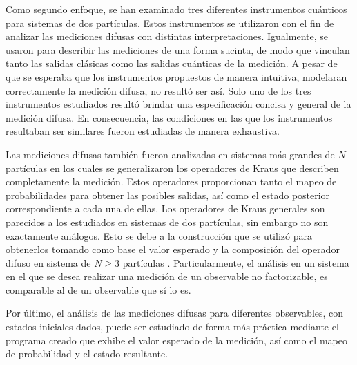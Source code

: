 
Como segundo enfoque, se han examinado tres diferentes instrumentos cuánticos
para sistemas de dos partículas. Estos instrumentos se utilizaron con el fin de
analizar las mediciones difusas con distintas interpretaciones.  Igualmente, se
usaron para describir las mediciones de una forma sucinta, de modo que vinculan
tanto las salidas clásicas como las salidas cuánticas de la medición. A pesar
de que se esperaba que los instrumentos propuestos de manera intuitiva,
modelaran correctamente la medición difusa, no resultó ser así. Solo uno de los
tres instrumentos estudiados resultó brindar una especificación concisa y
general de la medición difusa. En consecuencia, las condiciones en las que los
instrumentos resultaban ser similares fueron estudiadas de manera exhaustiva. 




Las mediciones difusas también fueron analizadas en sistemas más grandes de $N$
partículas en los cuales se generalizaron los operadores de Kraus que describen
completamente la medición. Estos operadores proporcionan tanto el mapeo de
probabilidades para obtener las posibles salidas, así como el estado posterior
correspondiente a cada una de ellas. Los operadores de Kraus generales son
parecidos a los estudiados en sistemas de dos partículas, sin embargo no son
exactamente análogos. Esto se debe a la construcción que se utilizó para
obtenerlos tomando como base el valor esperado y la composición del operador
difuso en sistema de $N\geq3$ partículas .
Particularmente, el análisis en un sistema en el que se desea realizar una
medición de un observable no factorizable, es comparable al de un observable
que sí lo es.


Por último, el análisis de las mediciones difusas para diferentes observables,
con estados iniciales dados, puede ser estudiado de forma más práctica mediante
el programa creado que exhibe el valor esperado de la medición, así como el
mapeo de probabilidad y el estado resultante.

